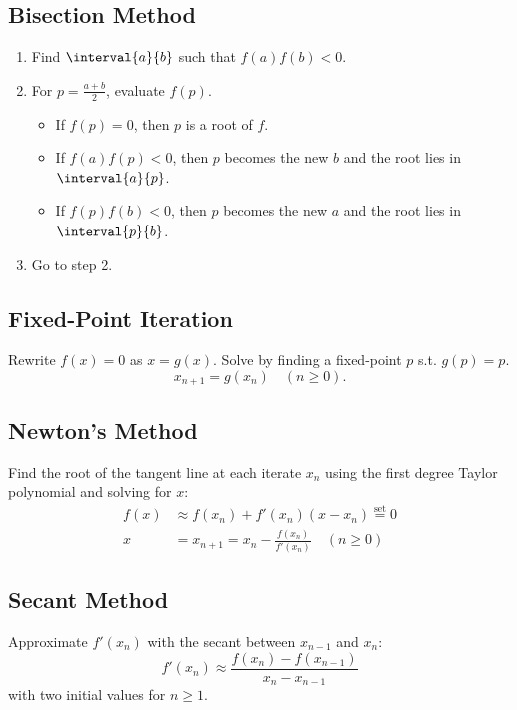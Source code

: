 \documentclass{article}
\begin{document}
\begin{multicols}{3}
    \subsection{Bisection Method}
    \begin{enumerate}
        \item Find \(\interval{a}{b}\) such that \(f\left( a \right) f\left( b \right) < 0\).
        \item For \(p = \tfrac{a+b}{2}\), evaluate \(f\left( p \right)\).
              \begin{itemize}
                  \item If \(f\left( p \right) = 0\), then \(p\) is a root of \(f\).
                  \item If \(f\left( a \right) f\left( p \right) < 0\), then \(p\) becomes the new \(b\) and the root lies in \(\interval{a}{p}\).
                  \item If \(f\left( p \right) f\left( b \right) < 0\), then \(p\) becomes the new \(a\) and the root lies in \(\interval{p}{b}\).
              \end{itemize}
        \item Go to step 2.
    \end{enumerate}
    \subsection{Fixed-Point Iteration}
    Rewrite \(f\left( x \right) = 0\) as \(x = g\left( x \right)\). Solve by finding a fixed-point
    \(p\) s.t. \(g\left( p \right) = p\).
    \begin{equation*}
        x_{n + 1} = g\left( x_n \right) \quad \left( n \geq 0 \right).
    \end{equation*}
    \subsection{Newton's Method}
    Find the root of the tangent line at each iterate \(x_n\) using the first degree Taylor polynomial
    and solving for \(x\):
    \begin{align*}
        f\left( x \right) & \approx f\left( x_n \right) + f'\left( x_n \right) \left( x - x_n \right) \overset{\mathrm{set}}{=} 0 \\
        x                 & = x_{n + 1} = x_n - \frac{f\left( x_n \right)}{f'\left( x_n \right)} \quad \left( n \geq 0 \right)
    \end{align*}
    \subsection{Secant Method}
    Approximate \(f'\left( x_n \right)\) with the secant between \(x_{n - 1}\) and \(x_n\):
    \begin{equation*}
        f'\left( x_n \right) \approx \frac{f\left( x_n \right) - f\left( x_{n - 1} \right)}{x_n - x_{n - 1}}
    \end{equation*}
    with two initial values for \(n \geq 1\).
\end{multicols}
\end{document}
